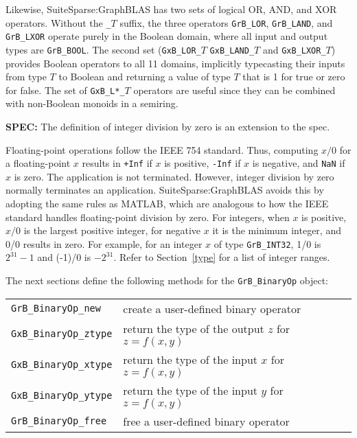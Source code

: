 \documentclass[12pt]{article}
\begin{document}
Likewise, SuiteSparse:GraphBLAS has two sets of logical OR, AND, and XOR
operators.  Without the \verb'_'$T$ suffix, the three operators \verb'GrB_LOR',
\verb'GrB_LAND', and \verb'GrB_LXOR' operate purely in the Boolean domain,
where all input and output types are \verb'GrB_BOOL'.  The second set
(\verb'GxB_LOR_'$T$ \verb'GxB_LAND_'$T$ and \verb'GxB_LXOR_'$T$) provides
Boolean operators to all 11 domains, implicitly typecasting their inputs from
type $T$ to Boolean and returning a value of type $T$ that is 1 for true or
zero for false.  The set of \verb'GxB_L*_'$T$ operators are useful since they
can be combined with non-Boolean monoids in a semiring.

\begin{spec}
{\bf SPEC:} The definition of integer division by zero is an extension to the spec.
\end{spec}

Floating-point operations follow the IEEE 754 standard.  Thus, computing $x/0$
for a floating-point $x$ results in \verb'+Inf' if $x$ is positive, \verb'-Inf'
if $x$ is negative, and \verb'NaN' if $x$ is zero.  The application is not
terminated.  However, integer division by zero normally terminates an
application.  SuiteSparse:GraphBLAS avoids this by adopting the same rules as
MATLAB, which are analogous to how the IEEE standard handles floating-point
division by zero.  For integers, when $x$ is positive, $x/0$ is the largest
positive integer, for negative $x$ it is the minimum integer, and 0/0 results
in zero.  For example, for an integer $x$ of type \verb'GrB_INT32', 1/0 is
$2^{31}-1$ and (-1)/0 is $-2^{31}$.  Refer to Section~\ref{type} for a list of
integer ranges.

The next sections define the following methods for the \verb'GrB_BinaryOp'
object:

\vspace{0.2in}
{\footnotesize
\begin{tabular}{ll}
\hline
\verb'GrB_BinaryOp_new'   & create a user-defined binary operator \\
\verb'GxB_BinaryOp_ztype' & return the type of the output $z$ for $z=f(x,y)$\\
\verb'GxB_BinaryOp_xtype' & return the type of the input $x$ for $z=f(x,y)$\\
\verb'GxB_BinaryOp_ytype' & return the type of the input $y$ for $z=f(x,y)$\\
\verb'GrB_BinaryOp_free'  & free a user-defined binary operator \\
\hline
\end{tabular}
}
\vspace{0.2in}
\end{document}
